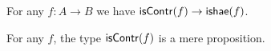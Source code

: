 \documentclass[hott-all.tex]{subfiles}
\begin{document}
%

\begin{thm}\label{thm:lequiv-contr-hae}
For any $f:A\to B$ we have ${\mathsf{isContr}(f)} \to {\ensuremath{\mathsf{ishae}}(f)}$.
\end{thm}
%

\begin{lem}\label{thm:contr-hprop}
  For any $f$, the type $\mathsf{isContr}(f)$ is a mere proposition.
\end{lem}
\end{document}

